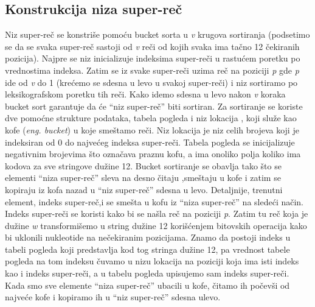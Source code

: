 \documentclass[a4paper]{article}
\begin{document}
{\subsection{Konstrukcija niza super-reč}
\label{subsec:knsr}
 Niz super-reč se konstriše pomoću bucket sorta u \textit{v} krugova sortiranja (podsetimo se da se svaka super-reč sastoji od \textit{v} reči od kojih svaka ima tačno 12 čekiranih pozicija). Najpre se niz inicializuje indeksima super-reči u rastućem poretku po vrednostima indeksa. Zatim se iz svake super-reči uzima reč na poziciji \textit{p} gde \textit{p} ide od \textit{v} do 1 (krećemo se sdesna u levo u svakoj super-reči) i niz sortiramo po leksikografskom poretku tih reči. Kako idemo sdesna u levo nakon \textit{v} koraka bucket sort garantuje da će ``niz super-reč'' biti sortiran. Za sortiranje se koriste dve pomoćne strukture podataka, tabela pogleda i niz lokacija , koji služe kao kofe (\textit{eng. bucket}) u koje smeštamo reči. Niz lokacija je niz celih brojeva koji je indeksiran od 0 do najvećeg indeksa super-reči.  Tabela pogleda se inicijalizuje negativnim brojevima što označava praznu kofu, a ima onoliko polja koliko ima kodova za sve stringove dužine 12. Bucket sortiranje se obavlja tako što se elementi ``niza super-reč'' sleva na desno  čitaju ,smeštaju u kofe i zatim se kopiraju iz kofa nazad u ``niz super-reč'' sdesna u levo. Detaljnije, trenutni element, indeks super-reč,i se smešta u kofu iz ``niza super-reč'' na sledeći način. Indeks super-reči se koristi kako bi se našla reč na poziciji \textit{p}. Zatim   tu reč koja je dužine \textit{w} transformišemo u string dužine 12 korišćenjem bitovskih operacija kako bi uklonili nukleotide na nečekiranim pozicijama. Znamo da postoji indeks u tabeli pogleda koji predstavlja kod tog stringa dužine 12, pa vrednost tabele pogleda na tom indeksu čuvamo u nizu lokacija na poziciji koja ima isti indeks kao i indeks super-reči, a u tabelu pogleda upisujemo sam indeks super-reči. Kada smo sve elemente ``niza super-reč'' ubacili u kofe, čitamo ih počevši od najveće kofe i kopiramo ih u ``niz super-reč'' sdesna ulevo.
}
\end{document}
